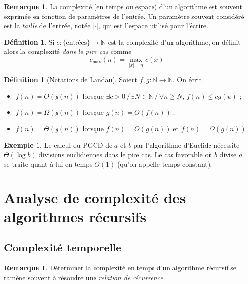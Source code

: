 \documentclass[a5paper, 10pt]{article}
\theoremstyle{definition}
\newtheorem{definition}[equation]{Définition}
\newtheorem{example}[equation]{Exemple}
\newtheorem{remark}[equation]{Remarque}
\newcounter{n}
\def\N{\mathbb{N}}
\begin{document}
\begin{remark}
  La complexité (en temps ou espace) d'un algorithme est souvent exprimée en
  fonction de paramètres de l'entrée. Un paramètre souvent considéré est la
  \emph{taille} de l'entrée, notée $|\cdot|$, qui est l'espace utilisé pour l'écrire.
\end{remark}

\begin{definition}
  Si $c : \{\text{entrées}\} \to \N$ est la complexité d'un algorithme, on
  définit alors la complexité \emph{dans le pire cas} comme
  \[c_{\mathrm{max}}(n) = \max_{|x| = n} c(x) \]
\end{definition}

\begin{definition}[Notations de Landau]
  Soient $f, g : \N \to \N$. On écrit
  \begin{itemize}
  \item $f(n) = O(g(n))$ lorsque $\exists c > 0 \,/\, \exists N \in \N \,/\, \forall
    n \geq N,\, f(n) \leq cg(n)$ ;
  \item $f(n) = \Omega(g(n))$ lorsque $g(n) = O(f(n))$ ;
  \item $f(n) = \Theta(g(n))$ lorsque $f(n) = O(g(n))$ et $f(n) = \Omega(g(n))$
  \end{itemize}
\end{definition}

\begin{example}
  Le calcul du PGCD de $a$ et $b$ par l'algorithme d'Euclide nécessite
  $\Theta(\log b)$ divisions euclidiennes dans le pire cas. Le cas favorable où
  $b$ divise $a$ se traite quant à lui en temps $O(1)$ (qu'on appelle temps
  constant).
\end{example}

\section{Analyse de complexité des algorithmes récursifs}

\subsection{Complexité temporelle}

\begin{remark}
  Déterminer la complexité en temps d'un algorithme récursif se ramène souvent à
  résoudre une \emph{relation de récurrence}.
\end{remark}
\end{document}
